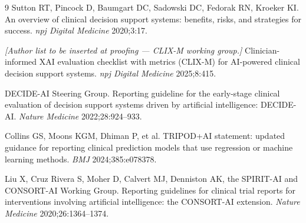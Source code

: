 \documentclass[11pt,a4paper]{article}
\begin{document}
\begin{thebibliography}{9}
 Sutton RT, Pincock D, Baumgart DC, Sadowski DC, Fedorak RN, Kroeker KI.
An overview of clinical decision support systems: benefits, risks, and strategies for success.
\emph{npj Digital Medicine} 2020;3:17.

 \emph{[Author list to be inserted at proofing --- CLIX-M working group.]}
Clinician-informed XAI evaluation checklist with metrics (CLIX-M) for AI-powered clinical decision support systems.
\emph{npj Digital Medicine} 2025;8:415.

 DECIDE-AI Steering Group.
Reporting guideline for the early-stage clinical evaluation of decision support systems driven by artificial intelligence: DECIDE-AI.
\emph{Nature Medicine} 2022;28:924--933.

 Collins GS, Moons KGM, Dhiman P, et al.
TRIPOD+AI statement: updated guidance for reporting clinical prediction models that use regression or machine learning methods.
\emph{BMJ} 2024;385:e078378.

 Liu X, Cruz Rivera S, Moher D, Calvert MJ, Denniston AK, the SPIRIT-AI and CONSORT-AI Working Group.
Reporting guidelines for clinical trial reports for interventions involving artificial intelligence: the CONSORT-AI extension.
\emph{Nature Medicine} 2020;26:1364--1374.

\end{thebibliography}
\end{document}
